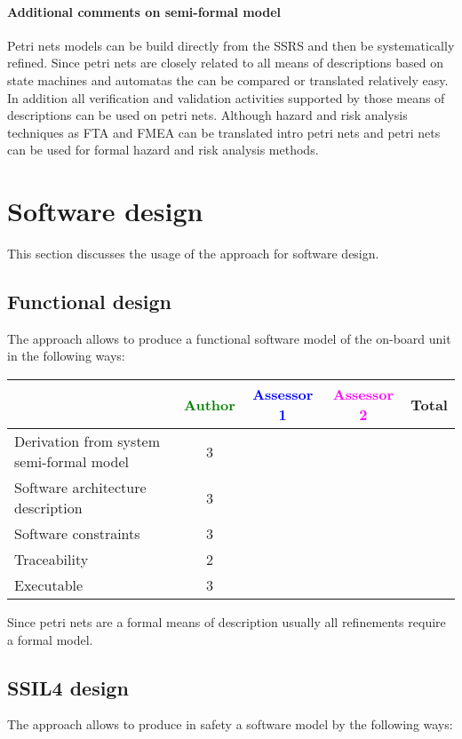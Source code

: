 \paragraph{Additional comments on semi-formal  model} 
Petri nets models can be build directly from the SSRS and then be systematically refined. 
Since petri nets are closely related to all means of descriptions based on state machines and automatas the can be compared or translated relatively easy. In addition all verification and validation activities supported by those means of descriptions can be used on petri nets. Although hazard and risk analysis techniques as FTA and FMEA can be translated intro petri nets and petri nets can be used for formal hazard and risk analysis methods.


\section{Software design}
This section discusses the usage of the approach for software design.

\subsection{Functional design}

The approach allows to  produce a functional software model of the on-board unit in the following ways:

\begin{tabular}{|l | c | c | c | c|}
\hline
& \textcolor{green}{Author} & \textcolor{blue}{Assessor 1} & \textcolor{magenta}{Assessor 2} & Total \\
\hline
Derivation from system semi-formal model  & 3 & & &  \\
\hline 
Software architecture description  & 3 & & &  \\
\hline
Software constraints  & 3 & & &  \\
\hline
Traceability  & 2 & & &  \\
\hline
Executable  & 3 & & &  \\
\hline
\end{tabular}
Since petri nets are a formal means of description usually all refinements require a formal model.

\subsection{SSIL4 design}

The approach allows to  produce in safety a software model by the following ways:


